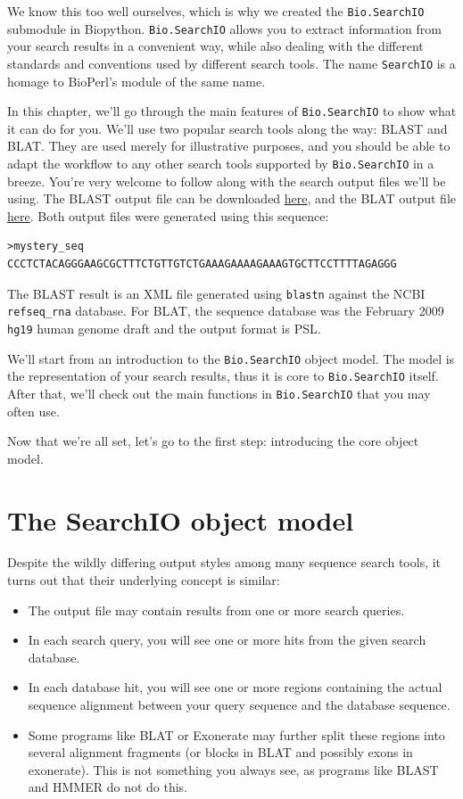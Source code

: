 \documentclass{report}
\begin{document}
We know this too well ourselves, which is why we created the \verb|Bio.SearchIO|
submodule in Biopython. \verb|Bio.SearchIO| allows you to extract information
from your search results in a convenient way, while also dealing with the
different standards and conventions used by different search tools.
The name \verb|SearchIO| is a homage to BioPerl's module of the same name.

In this chapter, we'll go through the main features of \verb|Bio.SearchIO| to
show what it can do for you. We'll use two popular search tools along the way:
BLAST and BLAT. They are used merely for illustrative purposes, and you should
be able to adapt the workflow to any other search tools supported by
\verb|Bio.SearchIO| in a breeze. You're very welcome to follow along with the
search output files we'll be using. The BLAST output file can be downloaded
\href{http://biopython.org/SRC/Tests/Tutorial/my_blast.xml}{here},
and the BLAT output file
\href{http://biopython.org/SRC/Tests/Tutorial/my_blat.psl}{here}.
Both output files were generated using this sequence:

\begin{verbatim}
>mystery_seq
CCCTCTACAGGGAAGCGCTTTCTGTTGTCTGAAAGAAAAGAAAGTGCTTCCTTTTAGAGGG
\end{verbatim}

The BLAST result is an XML file generated using \verb|blastn| against the NCBI
\verb|refseq_rna| database. For BLAT, the sequence database was the February 2009
\verb|hg19| human genome draft and the output format is PSL.

We'll start from an introduction to the \verb|Bio.SearchIO| object model. The
model is the representation of your search results, thus it is core to
\verb|Bio.SearchIO| itself. After that, we'll check out the main functions in
\verb|Bio.SearchIO| that you may often use.

Now that we're all set, let's go to the first step: introducing the core
object model.

\section{The SearchIO object model}
\label{sec:searchio-model}

Despite the wildly differing output styles among many sequence search tools,
it turns out that their underlying concept is similar:

\begin{itemize}
\item The output file may contain results from one or more search queries.
\item In each search query, you will see one or more hits from the given
search database.
\item In each database hit, you will see one or more regions containing the
actual sequence alignment between your query sequence and the database
sequence.
\item Some programs like BLAT or Exonerate may further split these regions into
several alignment fragments (or blocks in BLAT and possibly exons in
exonerate). This is not something you always see, as programs like BLAST and
HMMER do not do this.
\end{itemize}
\end{document}

